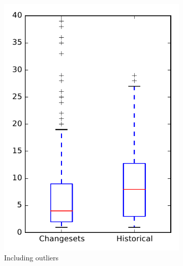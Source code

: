 
\begin{figure}
    \centering
    \begin{subfigure}{.4\textwidth}
        \centering
        \includegraphics[height=0.4\textheight]{figures/dit/rq2_mahout}
        \caption{Including outliers}\label{fig:dit:rq2:mahout_outlier}
    \end{subfigure}%
    \begin{subfigure}{.4\textwidth}
        \centering

\end{subfigure}
\end{figure}
